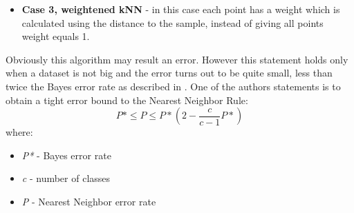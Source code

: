 \begin{itemize}
		\item \textbf{Case 3, weightened kNN} - in this case each point has a weight which is  calculated using the distance to the sample, instead of giving all points weight equals 1. 
	\end{itemize}
	
	Obviously this algorithm may result an error. However this statement holds only when a dataset is not big and the error turns out to be quite small, less than twice the Bayes error rate as described in \cite{duda-hart-classification}. One of the authors statements is to obtain a tight error bound to the Nearest Neighbor Rule:
	\[P*\leqslant P\leqslant P*(2-\frac{c}{c-1}P*)\]
	where:
	\begin{itemize}
		\item \textit{P*} - Bayes error rate
		\item \textit{c} - number of classes
		\item \textit{P} - Nearest Neighbor error rate
	\end{itemize}
	
